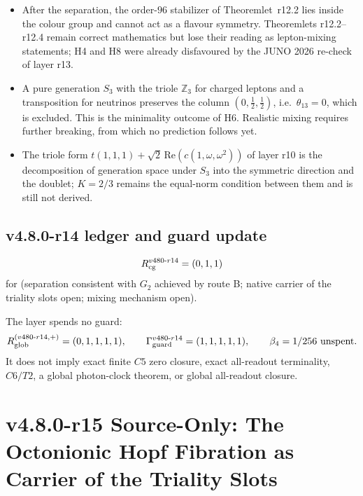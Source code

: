 \begin{itemize}
\item After the separation, the order-\(96\) stabilizer of Theoremlet~r12.2 lies inside the colour group and
cannot act as a flavour symmetry.  Theoremlets r12.2--r12.4 remain correct mathematics but lose their reading
as lepton-mixing statements; H4 and H8 were already disfavoured by the JUNO 2026 re-check of layer r13.
\item A pure generation \(S_3\) with the triole \(\mathbb Z_3\) for charged leptons and a transposition for
neutrinos preserves the column \((0,\tfrac12,\tfrac12)\), i.e.\ \(\theta_{13}=0\), which is excluded.  This is
the minimality outcome of H6.  Realistic mixing requires further breaking, from which no prediction follows yet.
\item The triole form \(t(1,1,1)+\sqrt2\,\mathrm{Re}(c(1,\omega,\omega^2))\) of layer r10 is the decomposition of
generation space under \(S_3\) into the symmetric direction and the doublet; \(K=2/3\) remains the equal-norm
condition between them and is still not derived.
\end{itemize}

\subsection*{v4.8.0-r14 ledger and guard update}
\label{subsec:v480-r14-ledger-guard}

\[
R_{\rm cg}^{v480\text{-}r14}=(0,1,1)
\]
for (separation consistent with \(G_2\) achieved by route B; native carrier of the triality slots open; mixing
mechanism open).

The layer spends no guard:
\[
R_{\rm glob}^{(v480\text{-}r14,+)}=(0,1,1,1,1),
\qquad
\Gamma_{\rm guard}^{v480\text{-}r14}=(1,1,1,1,1),
\qquad
\beta_4=1/256\ \text{unspent}.
\]
It does not imply exact finite \(C5\) zero closure, exact all-readout terminality,
\(C6/T2\), a global photon-clock theorem, or global all-readout closure.

\clearpage
\section*{v4.8.0-r15 Source-Only: The Octonionic Hopf Fibration as Carrier of the Triality Slots}
\label{sec:v480-r15-hopf-triality-carrier}


